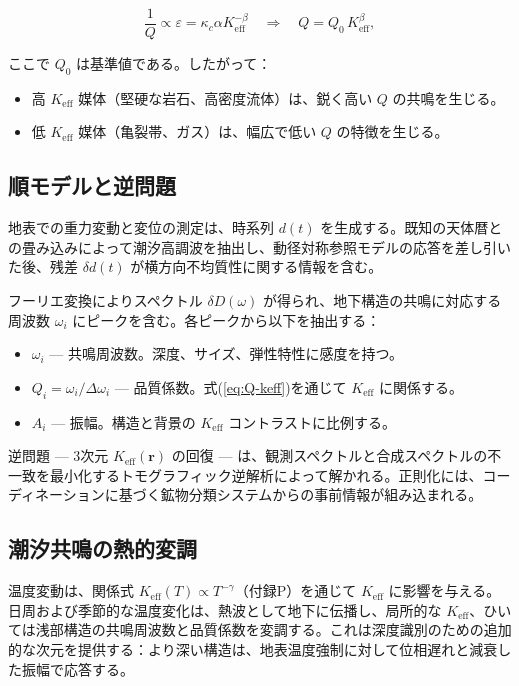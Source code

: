 \documentclass[12pt,a4paper]{article}
\theoremstyle{remark}
\newcommand{\Keff}{K_{\mathrm{eff}}}
\newcommand{\kappac}{\kappa_c}
\newcommand{\eps}{\varepsilon}
\begin{document}
	\begin{equation}
		\frac{1}{Q} \propto \eps = \kappac \alpha \Keff^{-\beta} \quad \Longrightarrow \quad Q = Q_0 \, \Keff^{\beta},
		\label{eq:Q-keff}
	\end{equation}
	
	ここで \(Q_0\) は基準値である。したがって：
	\begin{itemize}
		\item 高 \(\Keff\) 媒体（堅硬な岩石、高密度流体）は、鋭く高い \(Q\) の共鳴を生じる。
		\item 低 \(\Keff\) 媒体（亀裂帯、ガス）は、幅広で低い \(Q\) の特徴を生じる。
	\end{itemize}
	
	\subsection{順モデルと逆問題}
	
	地表での重力変動と変位の測定は、時系列 \(d(t)\) を生成する。既知の天体暦との畳み込みによって潮汐高調波を抽出し、動径対称参照モデルの応答を差し引いた後、残差 \(\delta d(t)\) が横方向不均質性に関する情報を含む。
	
	フーリエ変換によりスペクトル \(\delta D(\omega)\) が得られ、地下構造の共鳴に対応する周波数 \(\omega_i\) にピークを含む。各ピークから以下を抽出する：
	
	\begin{itemize}
		\item \(\omega_i\) — 共鳴周波数。深度、サイズ、弾性特性に感度を持つ。
		\item \(Q_i = \omega_i / \Delta \omega_i\) — 品質係数。式(\ref{eq:Q-keff})を通じて \(\Keff\) に関係する。
		\item \(A_i\) — 振幅。構造と背景の \(\Keff\) コントラストに比例する。
	\end{itemize}
	
	逆問題 — 3次元 \(\Keff(\mathbf{r})\) の回復 — は、観測スペクトルと合成スペクトルの不一致を最小化するトモグラフィック逆解析によって解かれる。正則化には、コーディネーションに基づく鉱物分類システムからの事前情報が組み込まれる。
	
	\subsection{潮汐共鳴の熱的変調}
	\label{sec:thermal-modulation}
	
	温度変動は、関係式 \(\Keff(T) \propto T^{-\gamma}\)（付録P）を通じて \(\Keff\) に影響を与える。日周および季節的な温度変化は、熱波として地下に伝播し、局所的な \(\Keff\)、ひいては浅部構造の共鳴周波数と品質係数を変調する。これは深度識別のための追加的な次元を提供する：より深い構造は、地表温度強制に対して位相遅れと減衰した振幅で応答する。
	
\end{document}
